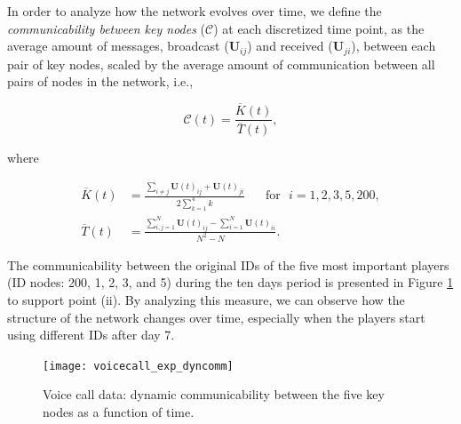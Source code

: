 In order to analyze how the network evolves over time, we define the \textit{communicability between key nodes} ($\mathcal{C}$) at each discretized time point, as the average amount of messages, broadcast ($\mathbf{U}_{ij}$) and received ($\mathbf{U}_{ji}$), between each pair of key nodes, scaled by the average amount of communication between all pairs of nodes in the network, i.e.,

\begin{equation*}
    \mathcal{C}(t) = \frac{\overline{K}(t)}{\overline{T}(t)},
\end{equation*}

where

\begin{align*}
    \overline{K}(t) &=\frac{\sum_{i\ne j}\mathbf{U}(t)_{ij} + \mathbf{U}(t)_{ji}}{2\sum_{k=1}^4 k} \text{~~~~~for~~} i=1,2,3,5,200 ,\\
    \overline{T}(t) &=\frac{\sum_{i,j=1}^N \mathbf{U}(t)_{ij} - \sum_{i=1}^N \mathbf{U}(t)_{ii}}{N^2-N}.
\end{align*}

The communicability between the original IDs of the five most important players (ID nodes: 200, 1, 2, 3, and 5) during the ten days period is presented in Figure \ref{fig:ve2} to support point (ii). By analyzing this measure, we can observe how the structure of the network changes over time, especially when the players start using different IDs after day 7.

\begin{figure}[h]\centering
    \texttt{[image: voicecall\_exp\_dyncomm]}
    \caption{Voice call data: dynamic communicability between the five key nodes as a function of time.}
    \label{fig:ve2}
    \bigskip
\end{figure}